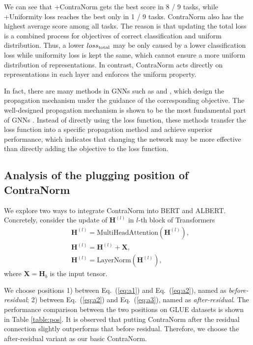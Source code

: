 \documentclass{article}
\def\mH{{\bm{H}}}
\def\mX{{\bm{X}}}
\theoremstyle{definition}
\theoremstyle{remark}
\theoremstyle{theorem}
\begin{document}
We can see that +ContraNorm gets the best score in 8 / 9 tasks, while +Uniformity loss reaches the best only in 1 / 9 tasks. ContraNorm also has the highest average score among all tasks. The reason is that updating the total loss is a combined process for objectives of correct classification and uniform distribution. Thus, a lower $loss_{\rm{total}}$ may be only caused by a lower classification loss while uniformity loss is kept the same, which cannot ensure a more uniform distribution of representations. In contrast, ContraNorm acts directly on representations in each layer and enforces the uniform property.

In fact, there are many methods in GNNs such as \citet{yang2021graph} and \citet{zhu2021interpreting}, which design the propagation mechanism under the guidance of the corresponding objective. The well-designed propagation mechanism is shown to be the most fundamental part of GNNs \citep{zhu2021interpreting}. Instead of directly using the loss function, these methods transfer the loss function into a specific propagation method and achieve superior performance, which indicates that changing the network may be more effective than directly adding the objective to the loss function.

\subsection{Analysis of the plugging position of ContraNorm} \label{appen:pos}
We explore two ways to integrate ContraNorm into BERT and ALBERT. Concretely, consider the update of $\mH^{(l)}$ in $l$-th block of Transformers 
\begin{align}
    &\mH^{(l)} = \mbox{MultiHeadAttention}(\mH^{(l)}), \label{eq:a1}\\
    &\mH^{(l)} = \mH^{(l)} + \mX, \label{eq:a2}\\
    &\mH^{(l)} = \mbox{LayerNorm}(\mH^{(l)}) \label{eq:a3},
\end{align}
where $\mX = \mH_b$ is the input tensor.

We choose positions 1) between Eq.~(\ref{eq:a1}) and Eq.~(\ref{eq:a2}), named as \textit{before-residual}; 2) between Eq.~(\ref{eq:a2}) and Eq.~(\ref{eq:a3}), named as \textit{after-residual}. The performance comparison between the two positions on GLUE datasets is shown in Table \ref{table:pos}. It is observed that putting ContraNorm after the residual connection slightly outperforms that before residual. Therefore, we choose the after-residual variant as our basic ContraNorm.
\end{document}
